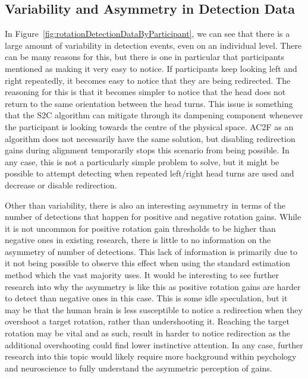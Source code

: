 \subsection{Variability and Asymmetry in Detection Data}
In Figure~\ref{fig:rotationDetectionDataByParticipant}, we can see that there is a large amount of variability in detection events, even on an individual level. There can be many reasons for this, but there is one in particular that participants mentioned as making it very easy to notice. If participants keep looking left and right repeatedly, it becomes easy to notice that they are being redirected. The reasoning for this is that it becomes simpler to notice that the head does not return to the same orientation between the head turns. This issue is something that the S2C algorithm can mitigate through its dampening component whenever the participant is looking towards the centre of the physical space. AC2F as an algorithm does not necessarily have the same solution, but disabling redirection gains during alignment temporarily stops this scenario from being possible. In any case, this is not a particularly simple problem to solve, but it might be possible to attempt detecting when repeated left/right head turns are used and decrease or disable redirection. 

Other than variability, there is also an interesting asymmetry in terms of the number of detections that happen for positive and negative rotation gains. While it is not uncommon for positive rotation gain thresholds to be higher than negative ones in existing research, there is little to no information on the asymmetry of number of detections. This lack of information is primarily due to it not being possible to observe this effect when using the standard estimation method which the vast majority uses. It would be interesting to see further research into why the asymmetry is like this as positive rotation gains are harder to detect than negative ones in this case. This is some idle speculation, but it may be that the human brain is less susceptible to notice a redirection when they overshoot a target rotation, rather than undershooting it. Reaching the target rotation may be vital and as such, result in harder to notice redirection as the additional overshooting could find lower instinctive attention. In any case, further research into this topic would likely require more background within psychology and neuroscience to fully understand the asymmetric perception of gains. 

